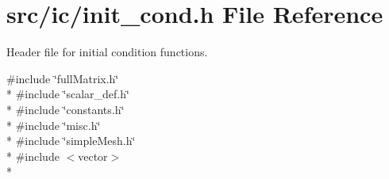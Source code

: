 \section{src/ic/init\-\_\-cond.h File Reference}
\label{init__cond_8h}


Header file for initial condition functions.  


{\ttfamily \#include \char`\"{}full\-Matrix.\-h\char`\"{}}\\*
{\ttfamily \#include \char`\"{}scalar\-\_\-def.\-h\char`\"{}}\\*
{\ttfamily \#include \char`\"{}constants.\-h\char`\"{}}\\*
{\ttfamily \#include \char`\"{}misc.\-h\char`\"{}}\\*
{\ttfamily \#include \char`\"{}simple\-Mesh.\-h\char`\"{}}\\*
{\ttfamily \#include $<$vector$>$}\\*
